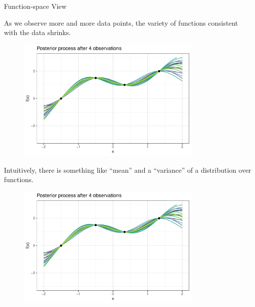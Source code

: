 \documentclass[11pt,compress,t,notes=noshow, xcolor=table]{beamer}
\begin{document}
\begin{vbframe}{Function-space View}

As we observe more and more data points, the variety of functions consistent with the data shrinks. 
  \begin{figure}
    \includegraphics[width=0.8\textwidth]{figure/gp_sample/2_4.pdf}
  \end{figure}

\framebreak 

Intuitively, there is something like \enquote{mean} and a \enquote{variance} of a distribution over functions. 

  \begin{figure}
    \includegraphics[width=0.8\textwidth]{figure/gp_sample/2_4.pdf}
  \end{figure}

\end{vbframe}






\endlecture
\end{document}

